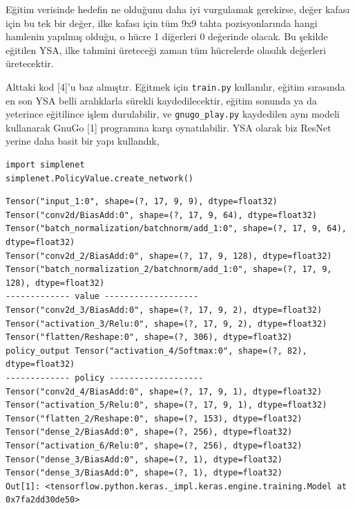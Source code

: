 \documentclass[12pt,fleqn]{article}\usepackage{../../common}
\begin{document}
Eğitim verisinde hedefin ne olduğunu daha iyi vurgulamak gerekirse, değer
kafası için bu tek bir değer, ilke kafası için tüm 9x9 tahta
pozisyonlarında hangi hamlenin yapılmış olduğu, o hücre 1 diğerleri 0
değerinde olacak. Bu şekilde eğitilen YSA, ilke tahmini üreteceği zaman tüm
hücrelerde olasılık değerleri üretecektir.

Alttaki kod [4]'u baz almıştır. Eğitmek için \verb!train.py! kullanılır,
eğitim sırasında en son YSA belli aralıklarla sürekli kaydedilecektir,
eğitim sonunda ya da yeterince eğitilince işlem durulabilir, ve
\verb!gnugo_play.py! kaydedilen aynı modeli kullanarak GnuGo [1] programına
karşı oynatılabilir. YSA olarak biz ResNet yerine daha basit bir yapı
kullandık,

\begin{verbatim}
import simplenet
simplenet.PolicyValue.create_network()
\end{verbatim}

\begin{verbatim}
Tensor("input_1:0", shape=(?, 17, 9, 9), dtype=float32)
Tensor("conv2d/BiasAdd:0", shape=(?, 17, 9, 64), dtype=float32)
Tensor("batch_normalization/batchnorm/add_1:0", shape=(?, 17, 9, 64), dtype=float32)
Tensor("conv2d_2/BiasAdd:0", shape=(?, 17, 9, 128), dtype=float32)
Tensor("batch_normalization_2/batchnorm/add_1:0", shape=(?, 17, 9, 128), dtype=float32)
------------- value -------------------
Tensor("conv2d_3/BiasAdd:0", shape=(?, 17, 9, 2), dtype=float32)
Tensor("activation_3/Relu:0", shape=(?, 17, 9, 2), dtype=float32)
Tensor("flatten/Reshape:0", shape=(?, 306), dtype=float32)
policy_output Tensor("activation_4/Softmax:0", shape=(?, 82), dtype=float32)
------------- policy -------------------
Tensor("conv2d_4/BiasAdd:0", shape=(?, 17, 9, 1), dtype=float32)
Tensor("activation_5/Relu:0", shape=(?, 17, 9, 1), dtype=float32)
Tensor("flatten_2/Reshape:0", shape=(?, 153), dtype=float32)
Tensor("dense_2/BiasAdd:0", shape=(?, 256), dtype=float32)
Tensor("activation_6/Relu:0", shape=(?, 256), dtype=float32)
Tensor("dense_3/BiasAdd:0", shape=(?, 1), dtype=float32)
Tensor("dense_3/BiasAdd:0", shape=(?, 1), dtype=float32)
Out[1]: <tensorflow.python.keras._impl.keras.engine.training.Model at 0x7fa2dd30de50>
\end{verbatim}

\inputminted[fontsize=\footnotesize]{python}{mcts.py}

\inputminted[fontsize=\footnotesize]{python}{train.py}

\inputminted[fontsize=\footnotesize]{python}{simplenet.py}
\end{document}
